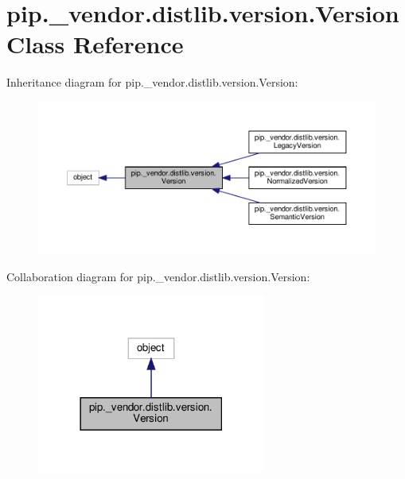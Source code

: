 \hypertarget{classpip_1_1__vendor_1_1distlib_1_1version_1_1Version}{}\section{pip.\+\_\+vendor.\+distlib.\+version.\+Version Class Reference}
\label{classpip_1_1__vendor_1_1distlib_1_1version_1_1Version}


Inheritance diagram for pip.\+\_\+vendor.\+distlib.\+version.\+Version\+:
\nopagebreak
\begin{figure}[H]
\begin{center}
\leavevmode
\includegraphics[width=350pt]{classpip_1_1__vendor_1_1distlib_1_1version_1_1Version__inherit__graph}
\end{center}
\end{figure}


Collaboration diagram for pip.\+\_\+vendor.\+distlib.\+version.\+Version\+:
\nopagebreak
\begin{figure}[H]
\begin{center}
\leavevmode
\includegraphics[width=213pt]{classpip_1_1__vendor_1_1distlib_1_1version_1_1Version__coll__graph}
\end{center}
\end{figure}
